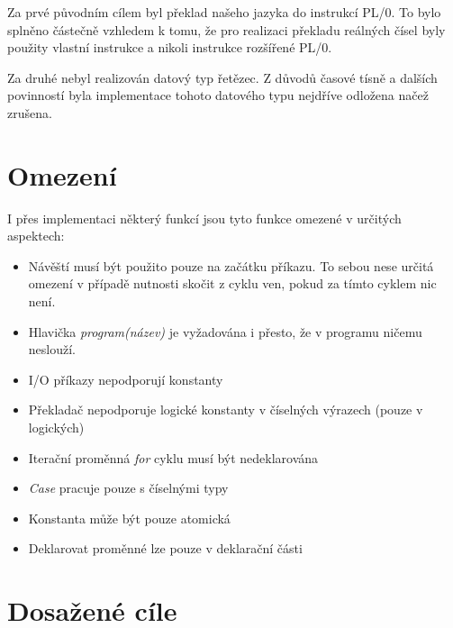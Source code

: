 \documentclass[
12pt,
a4paper,
pdftex,
czech,
titlepage
]{report}
\begin{document}
 Za prvé původním cílem byl překlad našeho jazyka do instrukcí PL/0. To bylo splněno částečně vzhledem k tomu, že pro realizaci překladu reálných čísel byly použity vlastní instrukce a nikoli instrukce rozšířené PL/0.
 
 Za druhé nebyl realizován datový typ řetězec. Z důvodů časové tísně a dalších povinností byla implementace tohoto datového typu nejdříve odložena načež zrušena. 

\section{Omezení}

I přes implementaci některý funkcí jsou tyto funkce omezené v určitých aspektech:

\begin{itemize}
\item Návěští musí být použito pouze na začátku příkazu. To sebou nese určitá omezení v případě nutnosti skočit z cyklu ven, pokud za tímto cyklem nic není.
\item Hlavička \textit{program(název)} je vyžadována i přesto, že v programu ničemu neslouží.
\item I/O příkazy nepodporují konstanty
\item Překladač nepodporuje logické konstanty v číselných výrazech (pouze v logických)
\item Iterační proměnná \textit{for} cyklu musí být nedeklarována
\item \textit{Case} pracuje pouze s číselnými typy
\item Konstanta může být pouze atomická
\item Deklarovat proměnné lze pouze v deklarační části
\end{itemize}

\section{Dosažené cíle}
\end{document}
